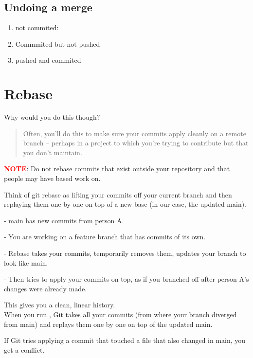\subsection{Undoing a merge}
\begin{enumerate}
    \item not commited: 
    \item Commmited but not pushed 
    \item pushed and commited 
\end{enumerate}

\section{Rebase}
Why would you do this though?
\begin{quote}
    Often, you'll do this to make sure your commits apply cleanly on a remote branch -- perhaps in a project to which you're trying to contribute but that you don't maintain.
\end{quote}

\begin{tcolorbox}[infoBox]
        \textcolor{red}{\textbf{NOTE}}: Do not rebase commits that exist outside your repository and that people may have based work on.
    \end{tcolorbox}

Think of git rebase as lifting your commits off your current branch and then replaying them one by one on top of a new base (in our case, the updated main).

- main has new commits from person A.

- You are working on a feature branch that has commits of its own.

- Rebase takes your commits, temporarily removes them, updates your branch to look like main.

- Then tries to apply your commits on top, as if you branched off after person A's changes were already made.

This gives you a clean, linear history.\\

When you run , Git takes all your commits (from where your branch diverged from main) and replays them one by one on top of the updated main.

If Git tries applying a commit that touched a file that also changed in main, you get a conflict.


